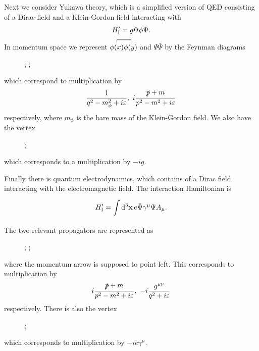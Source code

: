 Next we consider Yukawa theory, which is a simplified version of QED consisting of a Dirac field and a Klein-Gordon field interacting with
\begin{align*}
	H_{\text{I}}^{\prime} = g\bar{\Psi}\phi\Psi.
\end{align*}
In momentum space we represent $\contraction{}{\phi(x)}{}{\phi(y)}\phi(x)\phi(y)$ and $\Psi\bar{\Psi}$ by the Feynman diagrams
\begin{figure}[!ht]
	\centering
	;
	;
\end{figure}
which correspond to multiplication by
\begin{align*}
	\frac{1}{q^{2} - m_{\phi}^{2} + i\varepsilon},\ i\frac{\slashed{p} + m}{p^{2} - m^{2} + i\varepsilon}
\end{align*}
respectively, where $m_{\phi}$ is the bare mass of the Klein-Gordon field. We also have the vertex
\begin{figure}[!ht]
	\centering
	;
\end{figure}
which corresponds to a multiplication by $-ig$.

Finally there is quantum electrodynamics, which contains of a Dirac field interacting with the electromagnetic field. The interaction Hamiltonian is
\begin{align*}
	H_{\text{I}}^{\prime} = \int\limits_{}^{}\dd[3]{\vb{x}}e\bar{\Psi}\gamma^{\mu}\Psi A_{\mu}.
\end{align*}
The two relevant propagators are represented as
\begin{figure}[!ht]
	\centering
	;
	;
\end{figure}
where the momentum arrow is supposed to point left. This corresponds to multiplication by
\begin{align*}
	i\frac{\fsl{p} + m}{p^{2} - m^{2} + i\varepsilon},\ -i\frac{g^{\mu\nu}}{q^{2} + i\varepsilon}
\end{align*}
respectively. There is also the vertex
\begin{figure}[!ht]
	\centering
	;
\end{figure}
which corresponds to multiplication by $-ie\gamma^{\mu}$.

